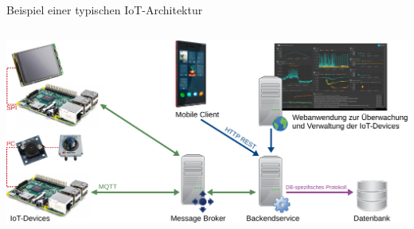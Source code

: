 {

\begin{frame}[plain]
\end{frame}
}

\begin{frame}{Beispiel einer typischen IoT-Architektur}
    \begin{columns}
        \column{\dimexpr\paperwidth-10pt}
        \includegraphics[width=\textwidth]{01-grundlagen/img/architektur_beispiel}
    \end{columns}
\end{frame}

